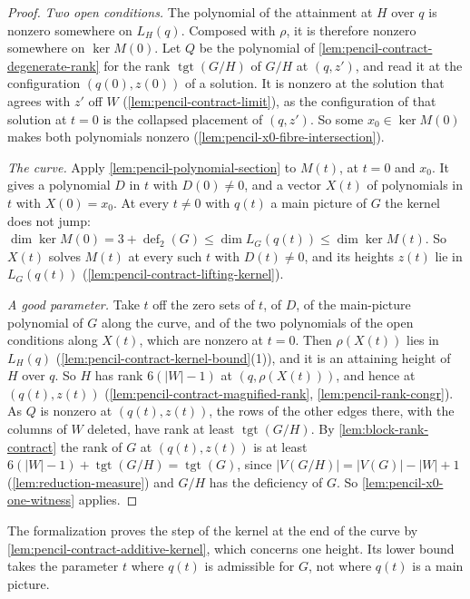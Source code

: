 \begin{proof}
  \emph{Two open conditions.} The polynomial of the attainment at $H$
  over $q$ is nonzero somewhere on $L_H(q)$. Composed with $\rho$, it is
  therefore nonzero somewhere on $\ker M(0)$. Let $Q$ be the polynomial of
  \cref{lem:pencil-contract-degenerate-rank} for the rank
  $\operatorname{tgt}(G/H)$ of $G/H$ at $(q, z')$, and read it at the
  configuration $(q(0), z(0))$ of a solution. It is nonzero at the
  solution that agrees with $z'$ off $W$
  (\cref{lem:pencil-contract-limit}), as the configuration of that
  solution at $t = 0$ is the collapsed placement of $(q, z')$. So some
  $x_0 \in \ker M(0)$ makes both polynomials nonzero
  (\cref{lem:pencil-x0-fibre-intersection}).

  \emph{The curve.} Apply \cref{lem:pencil-polynomial-section} to $M(t)$,
  at $t = 0$ and $x_0$. It
  gives a polynomial $D$ in $t$ with $D(0) \neq 0$, and a vector $X(t)$
  of polynomials in $t$ with $X(0) = x_0$. At every $t \neq 0$ with
  $q(t)$ a main picture of $G$ the kernel does not jump:
  $\dim \ker M(0) = 3 + \operatorname{def}_2(G) \le \dim L_G(q(t)) \le
  \dim \ker M(t)$. So $X(t)$ solves $M(t)$ at every such $t$ with
  $D(t) \neq 0$, and its heights $z(t)$ lie in $L_G(q(t))$
  (\cref{lem:pencil-contract-lifting-kernel}).

  \emph{A good parameter.} Take $t$ off the zero sets of $t$, of $D$, of
  the main-picture polynomial of $G$ along the curve, and of the two
  polynomials of the open conditions along $X(t)$, which are nonzero at
  $t = 0$. Then $\rho(X(t))$ lies in $L_H(q)$
  (\cref{lem:pencil-contract-kernel-bound}(1)), and it is an attaining
  height of $H$ over $q$. So $H$ has rank $6(|W| - 1)$ at
  $(q, \rho(X(t)))$, and hence at $(q(t), z(t))$
  (\cref{lem:pencil-contract-magnified-rank}, \cref{lem:pencil-rank-congr}).
  As $Q$ is nonzero at $(q(t), z(t))$, the rows of the other edges there,
  with the columns of $W$ deleted, have rank at least
  $\operatorname{tgt}(G/H)$. By \cref{lem:block-rank-contract} the rank of
  $G$ at $(q(t), z(t))$ is at least
  $6(|W| - 1) + \operatorname{tgt}(G/H) = \operatorname{tgt}(G)$, since
  $|V(G/H)| = |V(G)| - |W| + 1$ (\cref{lem:reduction-measure}) and $G/H$
  has the deficiency of $G$. So
  \cref{lem:pencil-x0-one-witness} applies.
\end{proof}
\begin{fmlnote}
  The formalization proves the step of the kernel at the end of the
  curve by \cref{lem:pencil-contract-additive-kernel}, which concerns one
  height. Its lower bound takes the parameter $t$ where $q(t)$ is
  admissible for $G$, not where $q(t)$ is a main picture.
\end{fmlnote}

